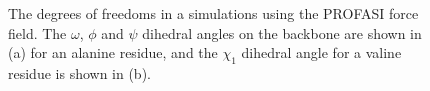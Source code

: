 \begin{figure}%
    \centering
    \qquad
    \caption{The degrees of freedoms in a simulations using the PROFASI force field. The $\omega$, $\phi$ and $\psi$ dihedral angles on the backbone are shown in (a) for an alanine residue, and the $\chi_1$ dihedral angle for a valine residue is shown in (b).} 
    \label{fig:dofs}%
\end{figure}
% 
% 
% 


